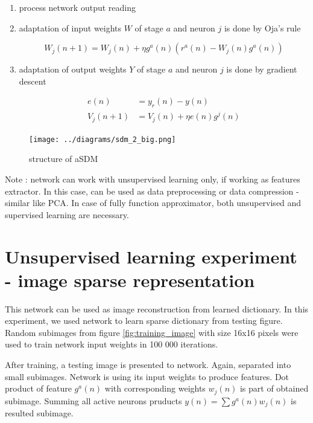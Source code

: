 \documentclass[10pt,a4paper]{article}
\begin{document}
\begin{enumerate}
\item process network output reading
\item adaptation of input weights $W$ of stage $a$ and neuron $j$ is done by Oja's rule

\begin{equation}
\label{eq:input_weights_learning}
W_j(n+1)= W_j(n) + \eta g^a(n)(r^a(n) - W_j(n)g^a(n))
\end{equation}


\item adaptation of output weights $Y$ of stage $a$ and neuron $j$ is done by gradient descent

\begin{align}
\label{eq:output_weights_learning}
e(n) &= y_r(n) - y(n) \nonumber \\
V_j(n+1) &= V_j(n) + \eta e(n) g^j(n)
\end{align}
\end{enumerate}


\begin{figure}[ht]
  \centering
  \texttt{[image: ../diagrams/sdm\_2\_big.png]}
  \caption{structure of aSDM}
  \label{fig:sdm_structure}
\end{figure}

Note : network can work with unsupervised learning only, if working as features extractor. In
this case, can be used as data preprocessing or data compression - similar like PCA. In case
of fully function approximator, both unsupervised and supervised learning are necessary.













\newpage
\section{Unsupervised learning experiment - image sparse representation}
This network can be used as image reconstruction from learned dictionary.
In this experiment, we used network to learn sparse dictionary from testing figure.
Random subimages from figure \ref{fig:training_image} with size 16x16 pixels were used to train network input weights in
100 000 iterations.

After training, a testing image is presented to network. Again, separated into small
subimages. Network is using its input weights to produce features. Dot product
of feature $g^a(n)$ with corresponding weights $w_j(n)$ is part of obtained subimage.
Summing all active neurons pruducts $y(n) = \sum g^a(n)w_j(n)$ is resulted subimage.
\end{document}
